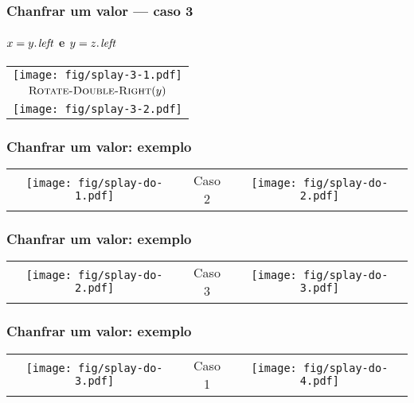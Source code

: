 \documentclass{beamer}
\begin{document}
\begin{frame}
\frametitle{Chanfrar um valor --- caso 3}
\framesubtitle{$x = \attrib{y}{left}$ e $y = \attrib{z}{left}$}

\begin{tabular}{c}
\texttt{[image: fig/splay-3-1.pdf]} \\
$\textnormal{\scshape Rotate-Double-Right}(y)$ \\
\texttt{[image: fig/splay-3-2.pdf]}
\end{tabular}

\end{frame}

\begin{frame}
\frametitle{Chanfrar um valor: exemplo}

\begin{tabular}[t]{ccc}
\texttt{[image: fig/splay-do-1.pdf]} &
Caso 2 &
\texttt{[image: fig/splay-do-2.pdf]}
\end{tabular}

\end{frame}

\begin{frame}
\frametitle{Chanfrar um valor: exemplo}

\begin{tabular}[t]{ccc}
\texttt{[image: fig/splay-do-2.pdf]} &
Caso 3 &
\texttt{[image: fig/splay-do-3.pdf]}
\end{tabular}

\end{frame}

\begin{frame}
\frametitle{Chanfrar um valor: exemplo}

\begin{tabular}[t]{ccc}
\texttt{[image: fig/splay-do-3.pdf]} &
Caso 1 &
\texttt{[image: fig/splay-do-4.pdf]}
\end{tabular}

\end{frame}
\end{document}
